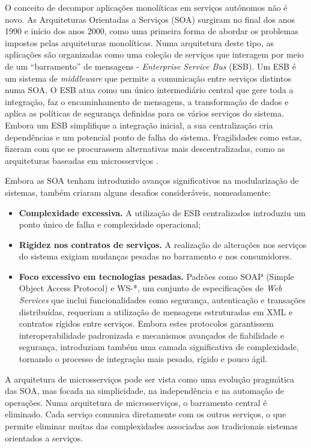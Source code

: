 O conceito de decompor aplicações monolíticas em serviços autónomos não é novo. As Arquiteturas Orientadas a Serviços (SOA) surgiram no final dos anos 1990 e início dos anos 2000, como uma primeira forma de abordar os problemas impostos pelas arquiteturas monolíticas. Numa arquitetura deste tipo, as aplicações são organizadas como uma coleção de serviços que interagem por meio de um “barramento” de mensagens - \textit{Enterprise Service Bus} (ESB). Um ESB é um sistema de \textit{middleware} que permite a comunicação entre serviços distintos numa SOA. O ESB atua como um único intermediário central que gere toda a integração, faz o encaminhamento de mensagens, a transformação de dados e aplica as políticas de segurança definidas para os vários serviços do sistema. Embora um ESB simplifique a integração inicial, a sua centralização cria dependências e um potencial ponto de falha do sistema. Fragilidades como estas, fizeram com que se procurassem alternativas mais descentralizadas, como as arquiteturas baseadas em microsserviços \cite{Aziz2020}.

Embora as SOA tenham introduzido avanços significativos na modularização de sistemas, também criaram alguns desafios consideráveis, nomeadamente:


\begin{itemize}
    \item \textbf{Complexidade excessiva.} A utilização de ESB centralizados introduziu um ponto único de falha e complexidade operacional;
    \item \textbf{Rigidez nos contratos de serviços.} A realização de alterações nos serviços do sistema exigiam mudanças pesadas no barramento e nos consumidores.
    \item \textbf{Foco excessivo em tecnologias pesadas.} Padrões como SOAP (Simple Object Access Protocol) e WS-*, um conjunto de especificações de \textit{Web Services} que inclui funcionalidades como segurança, autenticação e transações distribuídas, requeriam a utilização de mensagens estruturadas em XML e contratos rígidos entre serviços. Embora estes protocolos garantissem interoperabilidade padronizada e mecanismos avançados de fiabilidade e segurança, introduziam também uma camada significativa de complexidade, tornando o processo de integração mais pesado, rígido e pouco ágil.

\end{itemize}

A arquitetura de microsserviços pode ser vista como uma evolução pragmática das SOA, mas focada na simplicidade, na independência e na automação de operações. Numa arquitetura de microsserviços, o barramento central é eliminado. Cada serviço comunica diretamente com os outros serviços, o que permite eliminar muitas das complexidades associadas aos tradicionais sistemas orientados a serviços.

